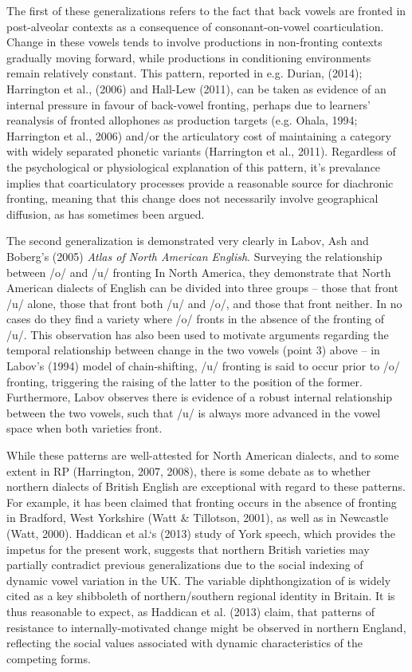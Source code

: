 \documentclass[12pt]{article}
\begin{document}
The first of these generalizations refers to the fact that back vowels are fronted in post-alveolar contexts as a consequence of consonant-on-vowel coarticulation. Change in these vowels tends to involve productions in non-fronting contexts gradually moving forward, while productions in conditioning environments remain relatively constant. This pattern, reported in e.g. Durian, (2014); Harrington et al., (2006) and Hall-Lew (2011), can be taken as evidence of an internal pressure in favour of back-vowel fronting, perhaps due to learners' reanalysis of fronted allophones as production targets (e.g. Ohala, 1994; Harrington et al., 2006) and/or the articulatory cost of maintaining a category with widely separated phonetic variants (Harrington et al., 2011). Regardless of the psychological or physiological explanation of this pattern, it's prevalance implies that coarticulatory processes provide a reasonable source for diachronic fronting, meaning that this change does not necessarily involve geographical diffusion, as has sometimes been argued.

The second generalization is demonstrated very clearly in Labov, Ash and Boberg's (2005) \textit{Atlas of North American English}. Surveying the relationship between /o/ and /u/ fronting In North America, they demonstrate that North American dialects of English can be divided into three groups -- those that front /u/ alone, those that front both /u/ and /o/, and those that front neither. In no cases do they find a variety where /o/ fronts in the absence of the fronting of /u/. This observation has also been used to motivate arguments regarding the temporal relationship between change in the two vowels (point 3) above -- in Labov's (1994) model of chain-shifting, /u/ fronting is said to occur prior to /o/ fronting, triggering the raising of the latter to the position of the former. Furthermore, Labov observes there is evidence of a robust internal relationship between the two vowels, such that /u/ is always more advanced in the vowel space when both varieties front. 

While these patterns are well-attested for North American dialects, and to some extent in RP (Harrington, 2007, 2008), there is some debate as to whether northern dialects of British English are exceptional with regard to these patterns. For example, it has been claimed that  fronting occurs in the absence of  fronting in Bradford, West Yorkshire (Watt \& Tillotson, 2001), as well as in Newcastle (Watt, 2000). Haddican et al.`s (2013) study of York speech, which provides the impetus for the present work, suggests that northern British varieties may partially contradict previous generalizations due to the social indexing of dynamic vowel variation in the UK. The variable diphthongization of  is widely cited as a key shibboleth of northern/southern regional identity in Britain. It is thus reasonable to expect, as Haddican et al. (2013) claim, that patterns of resistance to internally-motivated change might be observed in northern England, reflecting the social values associated with dynamic characteristics of the competing forms.
\end{document}
